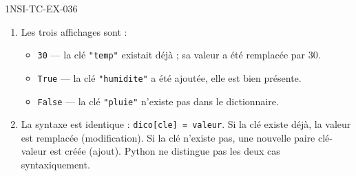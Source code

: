 \begin{corrige}{1NSI-TC-EX-036}
\begin{enumerate}
  \item Les trois affichages sont :
  \begin{itemize}
    \item \lstinline{30} --- la clé \lstinline{"temp"} existait déjà ; sa valeur a été remplacée par 30.
    \item \lstinline{True} --- la clé \lstinline{"humidite"} a été ajoutée, elle est bien présente.
    \item \lstinline{False} --- la clé \lstinline{"pluie"} n'existe pas dans le dictionnaire.
  \end{itemize}

  \item La syntaxe est identique : \lstinline{dico[cle] = valeur}. Si la clé existe déjà, la valeur est remplacée (modification). Si la clé n'existe pas, une nouvelle paire clé-valeur est créée (ajout). Python ne distingue pas les deux cas syntaxiquement.
\end{enumerate}
\end{corrige}
